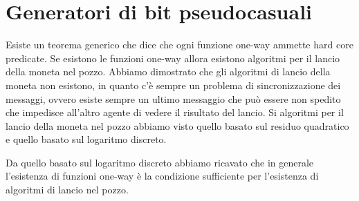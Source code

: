\setchapterpreamble[u]{\margintoc}
\chapter{Generatori di bit pseudocasuali}

Esiste un teorema generico che dice che ogni funzione one-way ammette hard core predicate. Se esistono le funzioni one-way allora esistono algoritmi per il lancio della moneta nel pozzo. Abbiamo dimostrato che gli algoritmi di lancio della moneta non esistono, in quanto c'è sempre un problema di sincronizzazione dei messaggi, ovvero esiste sempre un ultimo messaggio che può essere non spedito che impedisce all'altro agente di vedere il risultato del lancio. Si algoritmi per il lancio della moneta nel pozzo abbiamo visto quello basato sul residuo quadratico e quello basato sul logaritmo discreto.

Da quello basato sul logaritmo discreto abbiamo ricavato che in generale l'esistenza di funzioni one-way è la condizione sufficiente per l'esistenza di algoritmi di lancio nel pozzo.

